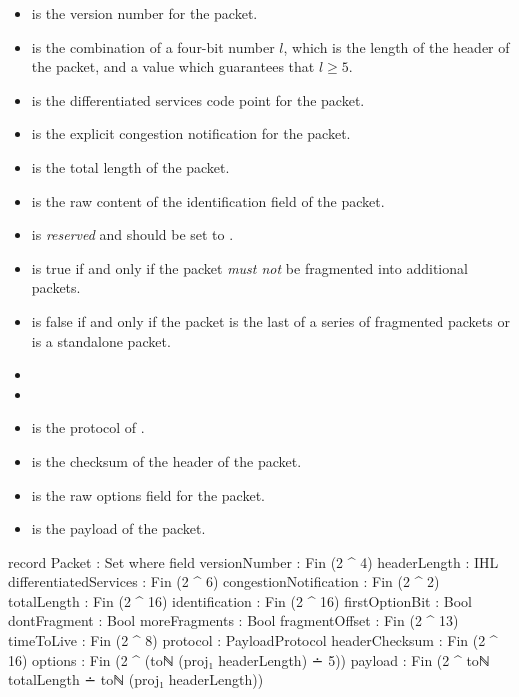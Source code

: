 \documentclass{report}
\begin{document}
\begin{itemize}
	\item {}  is the version number for the  packet.
	\item {}  is the combination of a four-bit number \(l\), which is the length of the header of the  packet, and a value which guarantees that \(l \geq 5\).
	\item {}  is the differentiated services code point for the  packet.
	\item {}  is the explicit congestion notification for the  packet.
	\item {}  is the total length of the  packet.
	\item {}  is the raw content of the identification field of the  packet.
	\item {}  is \emph{reserved} and should be set to .
	\item {}  is true if and only if the  packet \emph{must not} be fragmented into additional packets.
	\item {}  is false if and only if the  packet is the last of a series of fragmented packets or is a standalone packet.
	\item {} 
	\item {} 
	\item {}  is the protocol of  .
	\item {}  is the checksum of the header of the  packet.
	\item {}  is the raw options field for the  packet.
	\item {}  is the payload of the  packet.
\end{itemize}

\begin{code}
  record Packet : Set where
    field
      versionNumber : Fin (2 ^ 4)
      headerLength : IHL
      differentiatedServices : Fin (2 ^ 6)
      congestionNotification : Fin (2 ^ 2)
      totalLength : Fin (2 ^ 16)
      identification : Fin (2 ^ 16)
      firstOptionBit : Bool
      dontFragment : Bool
      moreFragments : Bool
      fragmentOffset : Fin (2 ^ 13)
      timeToLive : Fin (2 ^ 8)
      protocol : PayloadProtocol
      headerChecksum : Fin (2 ^ 16)
      options : Fin (2 ^ (toℕ (proj₁ headerLength) ∸ 5))
      payload : Fin (2 ^ toℕ totalLength ∸ toℕ (proj₁ headerLength))
\end{code}
\end{document}
